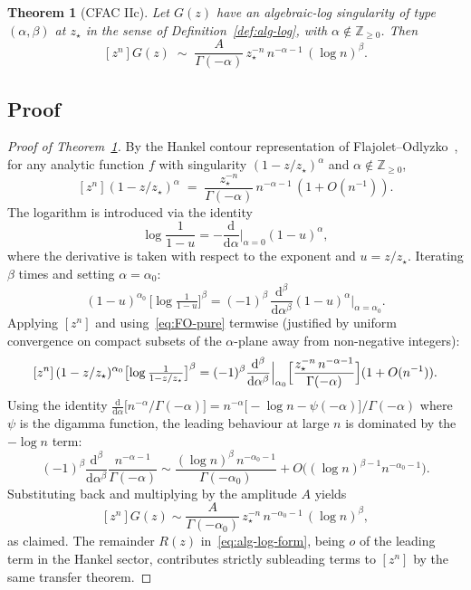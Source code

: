 \documentclass[11pt,a4paper]{article}
\newcommand{\dd}{\mathrm{d}}
\newcommand{\Z}{\mathbb{Z}}
\theoremstyle{plain}
\newtheorem{theorem}{Theorem}
\theoremstyle{definition}
\begin{document}
\begin{thmbox}
\begin{theorem}[CFAC IIc]
\label{thm:IIc}
Let $G(z)$ have an algebraic-log singularity of type $(\alpha, \beta)$
at $z_\star$ in the sense of Definition~\ref{def:alg-log}, with
$\alpha \notin \Z_{\geq 0}$.  Then
\begin{equation}
\label{eq:IIc-asymp}
  [z^n] G(z) \;\sim\; \frac{A}{\Gamma(-\alpha)}\, z_\star^{-n}\, n^{-\alpha - 1}\,(\log n)^\beta.
\end{equation}
\end{theorem}
\end{thmbox}

\subsection{Proof}

\begin{proof}[Proof of Theorem~\ref{thm:IIc}]
By the Hankel contour representation of
Flajolet--Odlyzko~\citep[Thm.\ VI.3]{FlajoletSedgewick}, for any
analytic function $f$ with singularity $(1 - z/z_\star)^\alpha$ and
$\alpha \notin \Z_{\geq 0}$,
\begin{equation}
\label{eq:FO-pure}
  [z^n] (1 - z/z_\star)^{\alpha}
  \;=\; \frac{z_\star^{-n}}{\Gamma(-\alpha)}\, n^{-\alpha - 1} \,(1 + O(n^{-1})).
\end{equation}
The logarithm is introduced via the identity
\begin{equation}
\label{eq:log-deriv}
  \log\frac{1}{1 - u} = -\frac{\dd}{\dd \alpha}\Big|_{\alpha = 0}(1 - u)^\alpha,
\end{equation}
where the derivative is taken with respect to the exponent and $u =
z/z_\star$.  Iterating $\beta$ times and setting $\alpha = \alpha_0$:
\[
  (1 - u)^{\alpha_0}\,\bigl[\log\tfrac{1}{1 - u}\bigr]^\beta
    = (-1)^\beta\, \frac{\dd^\beta}{\dd \alpha^\beta} (1 - u)^\alpha\Big|_{\alpha = \alpha_0}.
\]
Applying $[z^n]$ and using~\eqref{eq:FO-pure} termwise (justified
by uniform convergence on compact subsets of the $\alpha$-plane
away from non-negative integers):
\[
  [z^n]\,(1 - z/z_\star)^{\alpha_0}\bigl[\log\tfrac{1}{1 - z/z_\star}\bigr]^\beta
   = (-1)^\beta \frac{\dd^\beta}{\dd \alpha^\beta}\Big|_{\alpha_0}
     \Bigl[ \frac{z_\star^{-n}\, n^{-\alpha - 1}}{\Gamma(-\alpha)}\Bigr]
     (1 + O(n^{-1})).
\]
Using the identity
$\frac{\dd}{\dd \alpha}\bigl[n^{-\alpha}/\Gamma(-\alpha)\bigr]
= n^{-\alpha}\bigl[-\log n - \psi(-\alpha)\bigr]/\Gamma(-\alpha)$
where $\psi$ is the digamma function, the leading behaviour at large $n$
is dominated by the $-\log n$ term:
\[
  (-1)^\beta \frac{\dd^\beta}{\dd\alpha^\beta} \frac{n^{-\alpha-1}}{\Gamma(-\alpha)}
   \sim \frac{(\log n)^\beta\, n^{-\alpha_0-1}}{\Gamma(-\alpha_0)} + O\bigl((\log n)^{\beta-1} n^{-\alpha_0-1}\bigr).
\]
Substituting back and multiplying by the amplitude $A$ yields
\[
  [z^n] G(z) \sim \frac{A}{\Gamma(-\alpha_0)}\, z_\star^{-n}\, n^{-\alpha_0 - 1}\,(\log n)^\beta,
\]
as claimed.  The remainder $R(z)$ in~\eqref{eq:alg-log-form}, being
$o$ of the leading term in the Hankel sector, contributes strictly
subleading terms to $[z^n]$ by the same transfer theorem.
\end{proof}
\end{document}
